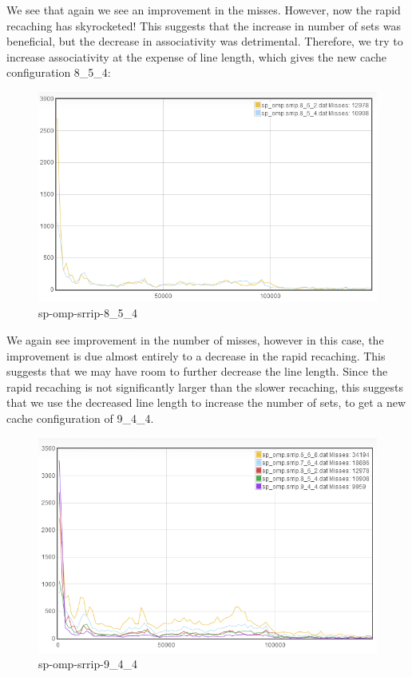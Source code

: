We see that again we see an improvement in the misses. However, now the rapid recaching has skyrocketed! This suggests that the increase in number of sets was beneficial, but the decrease in associativity was detrimental. Therefore, we try to increase associativity at the expense of line length, which gives the new cache configuration 8\_5\_4:

\begin{figure}
\begin{center}
\includegraphics[width={0.9\columnwidth}]{images/sp_omp-srrip-8_5_4}
\end{center}
\caption{sp-omp-srrip-8\_5\_4}
\label{8_5_4}
\end{figure}

We again see improvement in the number of misses, however in this case, the improvement is due almost entirely to a decrease in the rapid recaching. This suggests that we may have room to further decrease the line length. Since the rapid recaching is not significantly larger than the slower recaching, this suggests that we use the decreased line length to increase the number of sets, to get a new cache configuration of 9\_4\_4.

\begin{figure}
\begin{center}
\includegraphics[width={0.9\columnwidth}]{images/sp_omp-srrip-9_4_4}
\end{center}
\caption{sp-omp-srrip-9\_4\_4}
\label{9_4_4}
\end{figure}

